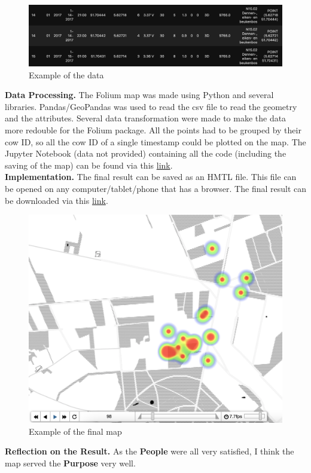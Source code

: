 \documentclass{article}
\begin{document}
\begin{figure}[ht]
    \centering
    \includegraphics[scale=.4]{csv.png}
    \caption{Example of the data}
    \label{fig:csvfile}
\end{figure}



\noindent
\textbf{Data Processing.}
The Folium map was made using Python and several libraries.
Pandas/GeoPandas was used to read the csv file to read the geometry and the attributes.
Several data transformation were made to make the data more redouble for the Folium package.
All the points had to be grouped by their cow ID, so all the cow ID of a single timestamp could be plotted on the map.
The Jupyter Notebook (data not provided) containing all the code (including the saving of the map) can be found via this \href{https://github.com/RobertvdV/GRS60312_RemoteSensingAndGISIntergration_IDV_Portfolio/blob/master/notebooks/1.0-TimeStampFoliumMap.ipynb}{link}.
\\

\noindent
\textbf{Implementation.}
The final result can be saved as an HMTL file. This file can be opened on any computer/tablet/phone that has a browser.
The final result can be downloaded via this \href{https://github.com/RobertvdV/GRS60312_RemoteSensingAndGISIntergration_IDV_Portfolio/blob/master/data/processed/HeathMapPerDag.html}{link}.
\begin{figure}[h!]
    \centering
    \includegraphics[scale=.35]{finalmap.png}
    \caption{Example of the final map}
    \label{fig:finmap}
\end{figure}

\noindent
\textbf{Reflection on the Result.}
As the \textbf{People} were all very satisfied, I think the map served the \textbf{Purpose} very well. 
\end{document}

